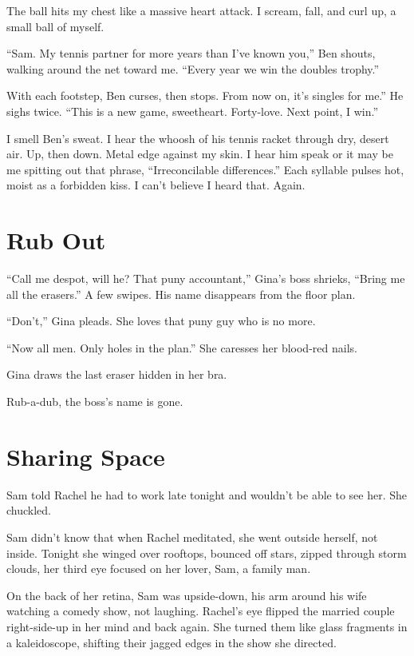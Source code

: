 \documentclass[twoside,10pt]{book}
\begin{document}
The ball hits my chest like a massive heart attack. I scream, fall, and
curl up, a small ball of myself.

``Sam. My tennis partner for more years than I've known you,'' Ben
shouts, walking around the net toward me. ``Every year we win the
doubles trophy.''

With each footstep, Ben curses, then stops. From now on, it's singles
for me.'' He sighs twice. ``This is a new game, sweetheart. Forty-love.
Next point, I win.''

I smell Ben's sweat. I hear the whoosh of his tennis racket through dry,
desert air. Up, then down. Metal edge against my skin. I hear him speak
or it may be me spitting out that phrase, ``Irreconcilable
differences.'' Each syllable pulses hot, moist as a forbidden kiss. I
can't believe I heard that. Again.



\cleardoublepage
\chapter{Rub Out}

``Call me despot, will he? That puny accountant,'' Gina's boss shrieks,
``Bring me all the erasers.'' A few swipes. His name disappears from the
floor plan.

``Don't,'' Gina pleads. She loves that puny guy who is no more.

``Now all men. Only holes in the plan.'' She caresses her blood-red
nails.

Gina draws the last eraser hidden in her bra.

Rub-a-dub, the boss's name is gone.



\cleardoublepage
\chapter{Sharing Space}

Sam told Rachel he had to work late tonight and wouldn't be able to see
her. She chuckled.

Sam didn't know that when Rachel meditated, she went outside herself,
not inside. Tonight she winged over rooftops, bounced off stars, zipped
through storm clouds, her third eye focused on her lover, Sam, a family
man.

On the back of her retina, Sam was upside-down, his arm around his wife
watching a comedy show, not laughing. Rachel's eye flipped the married
couple right-side-up in her mind and back again. She turned them like
glass fragments in a kaleidoscope, shifting their jagged edges in the
show she directed.
\end{document}

